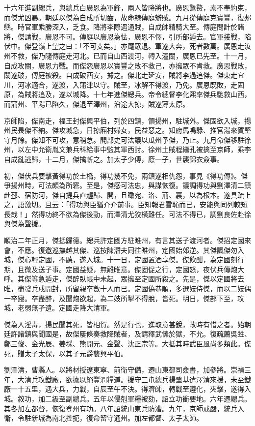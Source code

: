 \begin{pinyinscope}
十六年進副總兵，與總兵白廣恩為軍鋒，兩人皆降將也。廣恩鷙鰲，素不奉約束，而傑尤凶暴。朝廷以傑為自成所切齒，故命隸傳庭辦賊。九月從傳庭克寶豐，復郟縣。時官軍乘勝深入，乏食。降將李際遇通賊，自成帥精騎大至。傳庭問計於諸將，傑請戰，廣恩不可。傳庭以廣恩為怯，廣恩不懌，引所部遁去。官軍接戰，陷伏中。傑登嶺上望之曰：「不可支矣。」亦麾眾退。軍遂大奔，死者數萬。廣恩走汝州不救，傑乃隨傳庭走河北。已而自山西渡河，轉入潼關，廣恩已先至。十一月，自成攻關，廣恩力戰。而傑怨廣恩以寶豐之敗不救己，亦擁眾不肯救。廣恩戰敗，關遂破，傳庭被殺。自成破西安，據之。傑北走延安，賊將李過追傑。傑東走宜川，河冰適合，遂渡，入蒲津以守。賊至，冰解不得渡，乃免。廣恩既敗，走固原，為賊將追及，遂以城降。十七年進傑總兵。帝令總督李化熙率傑兵馳救山西，而蒲州、平陽已陷久，傑退至澤州，沿途大掠，賊遂薄太原。

京師陷，傑南走，福王封傑興平伯，列於四鎮，領揚州，駐城外。傑固欲入城，揚州民畏傑不納。傑攻城急，日掠廂村婦女，民益惡之。知府馬鳴騄、推官湯來賀堅守月餘。傑知不可攻，意稍怠。閣部史可法議以瓜州予傑，乃止。九月命傑移駐徐州，以左中允衛胤文兼兵科給事中監其軍西討。徐州土賊程繼孔被擒至京師，乘李自成亂逃歸，十二月，傑擒斬之。加太子少傅，廕一子，世襲錦衣僉事。

初，傑伏兵要擊黃得功於土橋，得功幾不免，兩鎮遂相仇怨，事見《得功傳》。傑爭揚州時，可法頗為所窘。至是，傑感可法忠，與謀恢復。議調得功與劉澤清二鎮赴邳、宿防河，傑自提兵直趨歸、開，且瞰宛、洛、荊、襄，以為根本。遂具疏上之，語激切。且云：「得功與臣猶介介前事。臣知報君雪恥而已，安能與同列較短長哉！」然得功終不欲為傑後勁，而澤清尤狡橫難任。可法不得已，調劉良佐赴徐與傑為聲援。

順治二年正月，傑抵歸德。總兵許定國方駐睢州，有言其送子渡河者。傑招定國來會，不應。復邀巡撫越其傑、巡按陳潛夫同往睢州，定國始郊逆。其傑諷傑勿入城，傑心輕定國，不聽，遂入城。十一日，定國置酒享傑。傑飲酣，為定國刻行期，且微及送子事。定國益疑，無離睢意。傑固促之行，定國怒，夜伏兵傳炮大呼。其傑等急遁走，傑醉臥帳中未起，眾擁至定國所殺之。先是，傑以定國將去睢，盡發兵戍開封，所留親卒數十人而已。定國偽恭順，多選妓侍傑，而以二妓偶一卒寢。卒盡醉，及聞炮欲起，為二妓所掣不得脫，皆死。明日，傑部下至，攻城，老弱無孑遺。定國走降大清軍。

傑為人淫毒，揚民聞其死，皆相賀。然是行也，進取意甚銳，故時有惜之者。始朝廷許諸鎮與聞國是，故傑屢條奏救降賊者，及請釋武愫於獄，不允。復疏薦吳甡、鄭三俊、金光辰、姜埰、熊開元、金聲、沈正宗等。大抵其時武臣風尚多類此。傑死，贈太子太保，以其子元爵襲興平伯。

劉澤清，曹縣人。以將材授遼東寧、前衛守備，遷山東都司僉書，加參將。崇禎三年，大清兵攻鐵廠，欲據以絕豐潤糧道。援守三屯總兵楊肇基遣澤清來援，未至鐵廠一十五里，遇大兵，力戰，自辰至午不決。得濟師，轉戰至遵化，夾擊，遂得入城。敘功，加二級至副總兵。五年以侵剋軍糧被劾，詔立功衝要地。六年遷總兵。其冬加左都督，恢復登州有功。八年詔統山東兵防漕。九年，京師戒嚴，統兵入衛，令駐新城為南北控扼，復命留守通州。加左都督、太子太師。


\end{pinyinscope}

